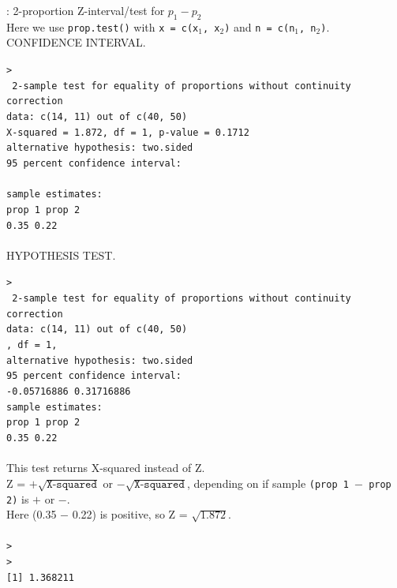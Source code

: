 \newpage
\noindent \R{}:  2-proportion Z-interval/test for $p_1-p_2$\\

\noindent Here we use \texttt{prop.test()} with \texttt{x = c(x$_1$, x$_2$)} and \texttt{n = c(n$_1$, n$_2$)}.  \\

\noindent 	CONFIDENCE INTERVAL.

\noindent \texttt{> }\\
\texttt{
	2-sample test for equality of proportions without continuity correction\\
data:  c(14, 11) out of c(40, 50)\\
X-squared = 1.872, df = 1,  p-value = 0.1712\\
alternative hypothesis: two.sided\\
95 percent confidence interval:\\
\\
sample estimates:\\
prop 1 prop 2 \\
  0.35   0.22 }\\ \\

\noindent HYPOTHESIS TEST.

\noindent \texttt{> }\\
\texttt{
	2-sample test for equality of proportions without continuity correction\\
data:  c(14, 11) out of c(40, 50)\\
, df = 1,  \\
alternative hypothesis: two.sided\\
95 percent confidence interval:\\
-0.05716886  0.31716886\\
sample estimates:\\
prop 1 prop 2 \\
  0.35   0.22 }\\ \\
This test returns X-squared instead of Z.   
\\Z = $+\sqrt{\texttt{X-squared}}$ or $-\sqrt{\texttt{X-squared}}$, depending on if sample \texttt{(prop 1 $-$ prop 2)} is $+$ or $-$. 
\\ Here (0.35 $-$ 0.22) is positive, so Z = $\sqrt{1.872}$.\\ \\
\texttt{> }\\
\texttt{> }\\
\texttt{[1] 1.368211}\\ \\


